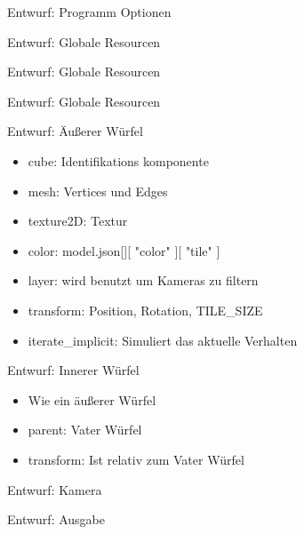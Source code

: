 \documentclass{../presentation}
\begin{document}
\frame[plain]{\titlepage}

\begin{frame}{Entwurf: Programm Optionen}
    
\end{frame}

\begin{frame}{Entwurf: Globale Resourcen}
    
\end{frame}

\begin{frame}{Entwurf: Globale Resourcen}
    
\end{frame}

\begin{frame}{Entwurf: Globale Resourcen}
    
\end{frame}

\begin{frame}{Entwurf: Äußerer Würfel}
    \begin{itemize}
        \item cube: Identifikations komponente
        \item mesh: Vertices und Edges
        \item texture2D: Textur
        \item color: model.json[][ "color" ][ "tile" ]
        \item layer: wird benutzt um Kameras zu filtern
        \item transform: Position, Rotation, TILE\_SIZE
        \item iterate\_implicit: Simuliert das aktuelle Verhalten
    \end{itemize}
\end{frame}

\begin{frame}{Entwurf: Innerer Würfel}
    \begin{itemize}
        \item Wie ein äußerer Würfel
        \item parent: Vater Würfel
        \item transform: Ist relativ zum Vater Würfel
    \end{itemize}
\end{frame}

\begin{frame}{Entwurf: Kamera}
    
\end{frame}

\begin{frame}{Entwurf: Ausgabe}
    
\end{frame}
\end{document}
